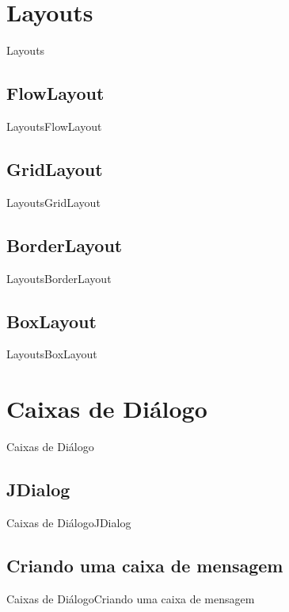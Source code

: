 \documentclass[10pt]{beamer}
\begin{document}
\section{Layouts}
\begin{frame}{Layouts}{}
\end{frame}{}

\subsection{FlowLayout}
\begin{frame}{Layouts}{FlowLayout}
\end{frame}{}

\subsection{GridLayout}
\begin{frame}{Layouts}{GridLayout}
\end{frame}{}

\subsection{BorderLayout}
\begin{frame}{Layouts}{BorderLayout}
\end{frame}{}

\subsection{BoxLayout}
\begin{frame}{Layouts}{BoxLayout}
\end{frame}{}


\section{Caixas de Diálogo}
\begin{frame}{Caixas de Diálogo}{}
\end{frame}{}

\subsection{JDialog}
\begin{frame}{Caixas de Diálogo}{JDialog}
\end{frame}{}
\subsection{Criando uma caixa de mensagem}
\begin{frame}{Caixas de Diálogo}{Criando uma caixa de mensagem}
\end{frame}{}
\end{document}
